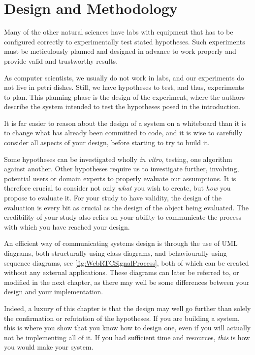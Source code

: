 \chapter{Design and Methodology}
\label{cha:design-and-method}

Many of the other natural sciences have labs with equipment that has
to be configured correctly to experimentally test stated hypotheses.
Such experiments must be meticulously planned and designed in advance
to work properly and provide valid and trustworthy results.

As computer scientists, we usually do not work in labs, and our
experiments do not live in petri dishes. Still, we have hypotheses to
test, and thus, experiments to plan. This planning phase is the design
of the experiment, where the authors describe the system intended to
test the hypotheses posed in the introduction. 

It is far easier to reason about the design of a system on a
whiteboard than it is to change what has already been committed to
code, and it is wise to carefully consider all aspects of your design,
before starting to try to build it.

Some hypotheses can be investigated wholly \emph{in vitro}, testing,
\eg one algorithm against another. Other hypotheses require us to
investigate further, involving, \eg potential users or domain experts
to properly evaluate our assumptions. It is therefore crucial to
consider not only \emph{what} you wish to create, but \emph{how} you
propose to evaluate it. For your study to have validity, the design of
the evaluation is every bit as crucial as the design of the object
being evaluated. The credibility of your study also relies on your
ability to communicate the process with which you have reached your
design.

An efficient way of communicating systems design is through the use of
\ac{UML} diagrams, both structurally using class diagrams, and
behaviourally using sequence diagrams, see
\autoref{fig:WebRTCSignalProcess}, both of which can be created
without any external applications.  These diagrams can later be
referred to, or modified in the next chapter, as there may well be
some differences between your design and your implementation.

Indeed, a luxury of this chapter is that the design may well go further
than solely the confirmation or refutation of the hypotheses.  If you
are building a system, this is where you show that you know how to
design one, even if you will actually not be implementing all of it.
If you had sufficient time and resources, \emph{this} is how you would make
your system.

